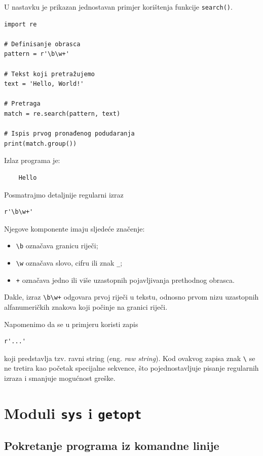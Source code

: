 U nastavku je prikazan jednostavan primjer korištenja funkcije \texttt{search()}.

\begin{verbatim}
import re

# Definisanje obrasca
pattern = r'\b\w+'

# Tekst koji pretražujemo
text = 'Hello, World!'

# Pretraga
match = re.search(pattern, text)

# Ispis prvog pronađenog podudaranja
print(match.group())
\end{verbatim}

Izlaz programa je:

\begin{verbatim}
	Hello
\end{verbatim}

Posmatrajmo detaljnije regularni izraz

\begin{verbatim}
r'\b\w+'
\end{verbatim}

Njegove komponente imaju sljedeće značenje:

\begin{itemize}
	\item \texttt{\textbackslash b} označava granicu riječi;
	\item \texttt{\textbackslash w} označava slovo, cifru ili znak \texttt{\_};
	\item \texttt{+} označava jedno ili više uzastopnih pojavljivanja prethodnog obrasca.
\end{itemize}

Dakle, izraz \texttt{\textbackslash b\textbackslash w+} odgovara prvoj riječi u tekstu, odnosno prvom nizu uzastopnih alfanumeričkih znakova koji počinje na granici riječi.

Napomenimo da se u primjeru koristi zapis \begin{verbatim}
r'...'
\end{verbatim}
koji predstavlja tzv. ravni string (eng. \textit{raw string}). Kod ovakvog zapisa znak \texttt{\textbackslash} se ne tretira kao početak specijalne sekvence, što pojednostavljuje pisanje regularnih izraza i smanjuje mogućnost greške.

\section{Moduli \texttt{sys} i \texttt{getopt}}

\subsection*{Pokretanje programa iz komandne linije}

